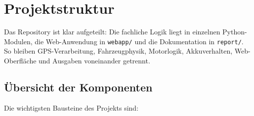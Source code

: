 \chapter{Projektstruktur}
\label{ch:projektstruktur}

Das Repository ist klar aufgeteilt: Die fachliche Logik liegt in einzelnen Python-Modulen, die Web-Anwendung in \texttt{webapp/} und die Dokumentation in \texttt{report/}. So bleiben GPS-Verarbeitung, Fahrzeugphysik, Motorlogik, Akkuverhalten, Web-Oberfläche und Ausgaben voneinander getrennt.

\section{Übersicht der Komponenten}

Die wichtigsten Bausteine des Projekts sind:

